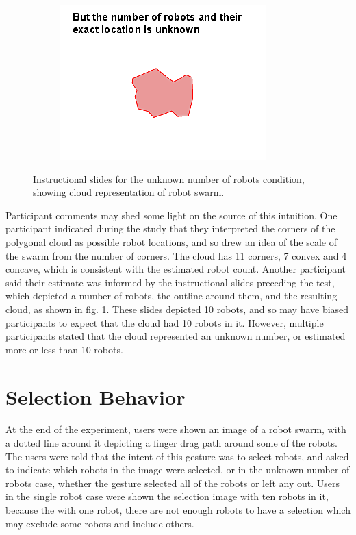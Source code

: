 \begin{figure}
\begin{subfigure}{0.3\textwidth}
		\includegraphics[width=\linewidth]{../ui_experiment/slide_images/Swarm_Robot_Control_-_Unknown_Number_of_Robots_0003.png}
	\end{subfigure}
	\caption{Instructional slides for the unknown number of robots condition, showing cloud representation of robot swarm.}
	\label{instructional_slides}
\end{figure}

Participant comments may shed some light on the source of this intuition. 
One participant indicated during the study that they interpreted the corners of the polygonal cloud as possible robot locations, and so drew an idea of the scale of the swarm from the number of corners. 
The cloud has 11 corners, 7 convex and 4 concave, which is consistent with the estimated robot count. 
Another participant said their estimate was informed by the instructional slides preceding the test, which depicted a number of robots, the outline around them, and the resulting cloud, as shown in fig. \ref{instructional_slides}. 
These slides depicted 10 robots, and so may have biased participants to expect that the cloud had 10 robots in it. 
However, multiple participants stated that the cloud represented an unknown number, or estimated more or less than 10 robots.

\section{Selection Behavior} \label{section:Selection_Strategy}

At the end of the experiment, users were shown an image of a robot swarm, with a dotted line around it depicting a finger drag path around some of the robots. 
The users were told that the intent of this gesture was to select robots, and asked to indicate which robots in the image were selected, or in the unknown number of robots case, whether the gesture selected all of the robots or left any out. 
Users in the single robot case were shown the selection image with ten robots in it, because the with one robot, there are not enough robots to have a selection which may exclude some robots and include others. 

